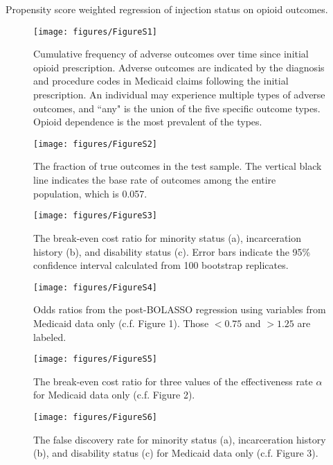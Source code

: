 \documentclass[9pt,twoside]{pnas-new}
\begin{document}
\begin{table}
\caption{Propensity score weighted regression of injection status on opioid outcomes.}
\centering

\end{table}

\begin{figure}
\caption{Cumulative frequency of adverse outcomes over time since initial opioid prescription. Adverse outcomes are indicated by the diagnosis and procedure codes in Medicaid claims following the initial prescription. An individual may experience multiple types of adverse outcomes, and ``any" is the union of the five specific outcome types. Opioid dependence is the most prevalent of the types.}
\centering
\texttt{[image: figures/FigureS1]}
\end{figure}

\begin{figure}
\caption{The fraction of true outcomes in the test sample. The vertical black line indicates the base rate of outcomes among the entire population, which is 0.057.}
\centering
\texttt{[image: figures/FigureS2]}
\end{figure}

\begin{figure}
\caption{The break-even cost ratio for minority status (a), incarceration history (b), and disability status (c). Error bars indicate the 95\% confidence interval calculated from 100 bootstrap replicates.}
\centering
\texttt{[image: figures/FigureS3]}
\end{figure}

\begin{figure}
\caption{Odds ratios from the post-BOLASSO regression using variables from Medicaid data only (c.f. Figure 1). Those $<0.75$ and $>1.25$ are labeled.}
\centering
\texttt{[image: figures/FigureS4]}
\end{figure}

\begin{figure}
\caption{The break-even cost ratio for three values of the effectiveness rate $\alpha$ for Medicaid data only (c.f. Figure 2).}
\centering
\texttt{[image: figures/FigureS5]}
\end{figure}

\begin{figure}
\caption{The false discovery rate for minority status (a), incarceration history (b), and disability status (c) for Medicaid data only (c.f. Figure 3).}
\centering
\texttt{[image: figures/FigureS6]}
\end{figure}
\end{document}
